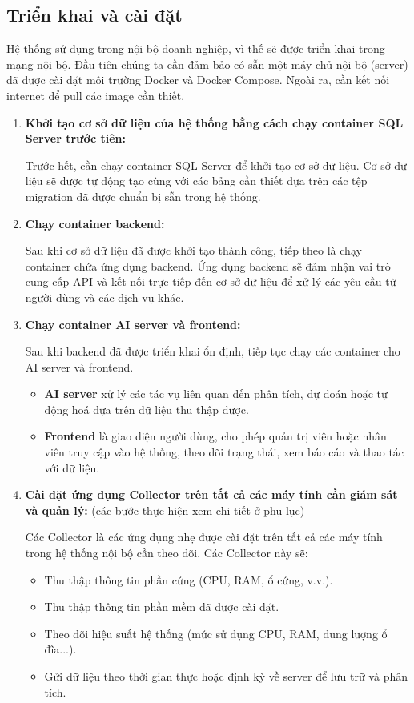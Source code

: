 \subsection{Triển khai và cài đặt}
\noindent Hệ thống sử dụng trong nội bộ doanh nghiệp, vì thế sẽ được triển khai trong mạng nội bộ. Đầu tiên chúng ta cần đảm bảo có sẵn một máy chủ nội bộ (server) đã được cài đặt môi trường Docker và Docker Compose. Ngoài ra, cần kết nối internet để pull các image cần thiết.
\begin{enumerate}[leftmargin=*]
    \item \textbf{Khởi tạo cơ sở dữ liệu của hệ thống bằng cách chạy container SQL Server trước tiên:}
    
    Trước hết, cần chạy container SQL Server để khởi tạo cơ sở dữ liệu. Cơ sở dữ liệu sẽ được tự động tạo cùng với các bảng cần thiết dựa trên các tệp migration đã được chuẩn bị sẵn trong hệ thống.

    \item \textbf{Chạy container backend:}

    Sau khi cơ sở dữ liệu đã được khởi tạo thành công, tiếp theo là chạy container chứa ứng dụng backend. Ứng dụng backend sẽ đảm nhận vai trò cung cấp API và kết nối trực tiếp đến cơ sở dữ liệu để xử lý các yêu cầu từ người dùng và các dịch vụ khác.

    \item \textbf{Chạy container AI server và frontend:}

    Sau khi backend đã được triển khai ổn định, tiếp tục chạy các container cho AI server và frontend. 
    \begin{itemize}[label=--]
        \item \textbf{AI server} xử lý các tác vụ liên quan đến phân tích, dự đoán hoặc tự động hoá dựa trên dữ liệu thu thập được.
        \item \textbf{Frontend} là giao diện người dùng, cho phép quản trị viên hoặc nhân viên truy cập vào hệ thống, theo dõi trạng thái, xem báo cáo và thao tác với dữ liệu.
    \end{itemize}

    \item \textbf{Cài đặt ứng dụng Collector trên tất cả các máy tính cần giám sát và quản lý:} (các bước thực hiện xem chi tiết ở phụ lục)

    Các Collector là các ứng dụng nhẹ được cài đặt trên tất cả các máy tính trong hệ thống nội bộ cần theo dõi. Các Collector này sẽ:
    \begin{itemize}[label=--]
        \item Thu thập thông tin phần cứng (CPU, RAM, ổ cứng, v.v.).
        \item Thu thập thông tin phần mềm đã được cài đặt.
        \item Theo dõi hiệu suất hệ thống (mức sử dụng CPU, RAM, dung lượng ổ đĩa...).
        \item Gửi dữ liệu theo thời gian thực hoặc định kỳ về server để lưu trữ và phân tích.
    \end{itemize}


\end{enumerate}
